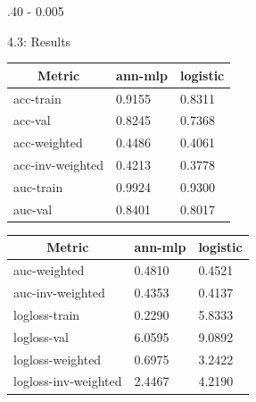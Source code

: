 \documentclass{postertheme}\usepackage[]{graphicx}\usepackage[]{color}
\begin{document}
\begin{frame}
\begin{columns}[onlytextwidth]
\begin{column}{.40 \textwidth - 0.005 \textwidth}
\begin{block}{4.3: Results}
      \begin{table}[h]
      \begin{minipage}[h]{0.49\textwidth}
        \centering
        \begin{tabular}{@{}lll@{}}
            \hline
            \multicolumn{1}{c}{\textbf{Metric}} & \multicolumn{1}{c}{\textbf{ann-mlp}} &
            \multicolumn{1}{c}{\textbf{logistic}} \\ \hline
            acc-train & 0.9155 & 0.8311 \\ \hline
            acc-val & 0.8245 & 0.7368 \\ \hline
            acc-weighted & 0.4486 & 0.4061 \\ \hline
            acc-inv-weighted & 0.4213 & 0.3778 \\ \hline
            auc-train & 0.9924 & 0.9300 \\ \hline
            auc-val & 0.8401 & 0.8017 \\ \hline
        \end{tabular}
      \end{minipage}
      \begin{minipage}[h]{0.49\textwidth}
        \centering
        \begin{tabular}{@{}lll@{}}
            \hline
            \multicolumn{1}{c}{\textbf{Metric}} & \multicolumn{1}{c}{\textbf{ann-mlp}} &
            \multicolumn{1}{c}{\textbf{logistic}} \\ \hline
            auc-weighted & 0.4810 & 0.4521 \\ \hline
            auc-inv-weighted & 0.4353 & 0.4137 \\ \hline
            logloss-train & 0.2290 & 5.8333 \\ \hline
            logloss-val & 6.0595 & 9.0892 \\ \hline
            logloss-weighted & 0.6975 & 3.2422 \\ \hline
            logloss-inv-weighted & 2.4467 & 4.2190 \\ \hline
        \end{tabular}
      \end{minipage}
\end{table}
      
    \end{block}
  \end{column}
  
\end{columns}



\end{frame}
\end{document}
